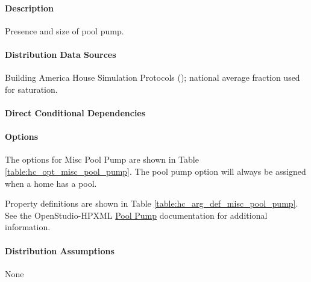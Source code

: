 \paragraph{Description}
% 
Presence and size of pool pump.

\paragraph{Distribution Data Sources}
% 
Building America House Simulation Protocols (\cite{Wilson2014});  national average fraction used for saturation.

\paragraph{Direct Conditional Dependencies}


\paragraph{Options}
The options for Misc Pool Pump are shown in Table \ref{table:hc_opt_misc_pool_pump}. The pool pump option will always be assigned when a home has a pool.



Property definitions are shown in Table \ref{table:hc_arg_def_misc_pool_pump}. See the OpenStudio-HPXML \href{https://openstudio-hpxml.readthedocs.io/en/v1.10.0/workflow_inputs.html#pool-pump}{ Pool Pump} documentation for additional information.



\paragraph{Distribution Assumptions}
% 
None
